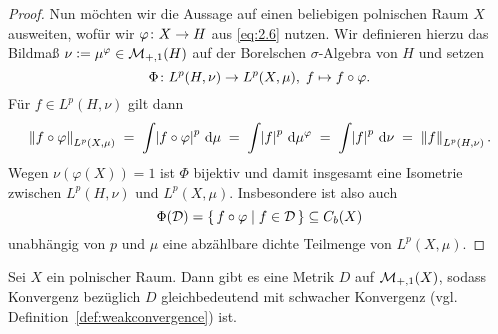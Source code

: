 \documentclass[../main/main.tex]{subfiles}
\begin{document}
\begin{proof}
		Nun möchten wir die Aussage auf einen beliebigen polnischen Raum $X$ ausweiten, 
		wofür wir $\varphi \colon X \to H$ aus \eqref{eq:2.6} nutzen.
		Wir definieren hierzu das Bildmaß $\nu \vcentcolon = \mu^\varphi \in \mathcal{M}_{+,1}(H)$ 
		auf der Borelschen $\sigma$-Algebra von $H$ und setzen
		\[\Phi \colon L^p(H, \nu) \to L^p(X, \mu), \; f \mapsto f \circ \varphi  \text{.}\]
		Für $f \in L^p(H, \nu)$ gilt dann
		\[ \left\lVert f \circ \varphi\right\rVert_{L^p(X, \mu)} 
		\; = \; \int_{} \, \left| f \circ \varphi \right|^p \, \mathrm{d}\mu 
		\; = \; \int_{} \, \left| f \right|^p \, \mathrm{d}\mu^\varphi 
		\; = \; \int_{} \, \left| f \right|^p \, \mathrm{d}\nu 
		\; = \; \left\lVert f\right\rVert_{L^p(H, \nu)} \text{.} \]
		Wegen $\nu(\varphi(X)) = 1$ ist $\Phi$ bijektiv und damit insgesamt eine Isometrie 
		zwischen $L^p(H, \nu)$ und $L^p(X, \mu)$. Insbesondere ist also auch 
		\[\Phi(\mathcal{D}) = \left\{\, f \circ \varphi \; \middle| \; f \in \mathcal{D} \,\right\} \subseteq C_b(X)\]
		unabhängig von $p$ und $\mu$ eine abzählbare dichte Teilmenge von $L^p(X, \mu)$.
	\end{proof}

	\begin{Satz}
		\label{thm:weakconvergencemetrizable}
		Sei $X$ ein polnischer Raum. Dann gibt es eine Metrik $D$ auf $\mathcal{M}_{+,1}(X)$, 
		sodass Konvergenz bezüglich $D$ gleichbedeutend mit schwacher Konvergenz 
		(vgl. Definition~\ref{def:weakconvergence}) ist.
	\end{Satz}
\end{document}
